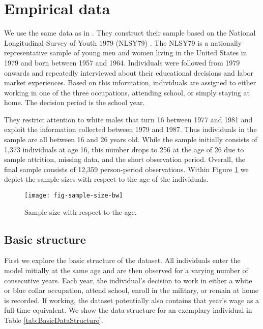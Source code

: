 \section{Empirical data}\label{Empirical data}
We use the same data as in \citet{Keane.1997}. They construct their sample based on the National Longitudinal Survey of Youth 1979 (NLSY79) \citep{NLSY.2019}. The NLSY79 is a nationally representative sample of young men and women living in the United States in 1979 and born between 1957 and 1964. Individuals were followed from 1979 onwards and repeatedly interviewed about their educational decisions and labor market experiences. Based on this information, individuals are assigned to either working in one of the three occupations, attending school, or simply staying at home. The decision period is the school year.

They restrict attention to white males that turn 16 between 1977 and 1981 and exploit the information collected between 1979 and 1987. Thus individuals in the sample are all between 16 and 26 years old. While the sample initially consists of 1,373 individuals at age 16, this number drops to 256 at the age of 26 due to sample attrition, missing data, and the short observation period. Overall, the final sample consists of 12,359 person-period observations.
Within Figure \ref{fig:SampleSizePerAge} we depict the sample sizes with respect to the age of the individuals.

\begin{figure}[h]\centering
\caption{Sample size with respect to the age.}\label{fig:SampleSizePerAge}
\texttt{[image: fig-sample-size-bw]}
\end{figure}

\subsection{Basic structure}
First we explore the basic structure of the dataset. All individuals enter the model initially at the same age and are then observed for a varying number of consecutive years. Each year, the individual’s decision to work in either a white or blue collar occupation, attend school, enroll in the military, or remain at home is recorded. If working, the dataset potentially also contains that year’s wage as a full-time equivalent. We show the data structure for an exemplary individual in Table \ref{tab:BasicDataStructure}.


